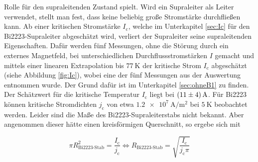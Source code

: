 Rolle für den supraleitenden Zustand spielt. Wird ein Supraleiter als Leiter
verwendet, stellt man fest, dass keine beliebig große Stromstärke durchfließen
kann. Ab einer kritischen Stromstärke $I_{\text{c}}$, welche im Unterkapitel \ref{sec:Ic}
für den Bi2223-Supraleiter abgeschätzt wird, verliert der Supraleiter seine
supraleitenden Eigenschaften. Dafür werden fünf Messungen, ohne die Störung durch ein
externes Magnetfeld, bei unterschiedlichen Durchflussstromstärken $I$ gemacht und mittels
einer linearen Extrapolation bis $\SI{77}{\kelvin}$ der kritische Strom $I_{\text{c}}$
abgeschätzt (siehe Abbildung \ref{fig:Ic}), wobei eine der fünf Messungen aus der
Auswertung entnommen wurde. Der Grund dafür ist im Unterkapitel \ref{sec:ohneB1}
zu finden. Der Schätzwert für die kritische Temperatur $I_{\text{c}}$ liegt bei
$\SI{11\pm4}{\ampere}$. Für Bi2223 können kritische Stromdichten $j_{\text{c}}$
von etwa $\SI{1.2e7}{\ampere\per\metre\squared}$ bei $\SI{5}{\kelvin}$
\cite[S. 345]{2223} beobachtet werden. Leider sind die Maße des Bi2223-Supraleiterstabs
nicht bekannt. Aber angenommen dieser hätte einen kreisförmigen Querschnitt, so
ergebe sich mit

\begin{equation*}
  \pi R_{\text{Bi2223-Stab}}^2 = \frac{I_{\text{c}}}{j_{\text{c}}}
  \iff
  R_{\text{Bi2223-Stab}} = \sqrt{\frac{I_{\text{c}}}{j_{\text{c}}\pi}}
\end{equation*}

